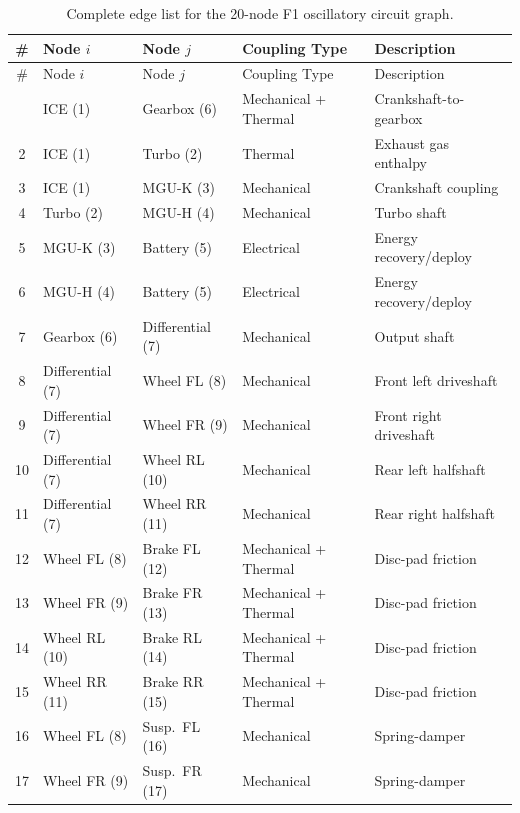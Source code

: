 \documentclass[twocolumn,10pt,a4paper]{article}
\theoremstyle{definition}
\theoremstyle{remark}
\begin{document}
\begin{longtable}{@{}cllll@{}}
\caption{Complete edge list for the 20-node F1 oscillatory circuit graph.} \label{tab:edges} \\
\toprule
\# & Node $i$ & Node $j$ & Coupling Type & Description \\
\midrule
\endfirsthead
\toprule
\# & Node $i$ & Node $j$ & Coupling Type & Description \\
\midrule
\endhead
\bottomrule
\endlastfoot
1  & ICE (1)          & Gearbox (6)      & Mechanical + Thermal & Crankshaft-to-gearbox \\
2  & ICE (1)          & Turbo (2)        & Thermal              & Exhaust gas enthalpy \\
3  & ICE (1)          & MGU-K (3)        & Mechanical           & Crankshaft coupling \\
4  & Turbo (2)        & MGU-H (4)        & Mechanical           & Turbo shaft \\
5  & MGU-K (3)        & Battery (5)      & Electrical           & Energy recovery/deploy \\
6  & MGU-H (4)        & Battery (5)      & Electrical           & Energy recovery/deploy \\
7  & Gearbox (6)      & Differential (7) & Mechanical           & Output shaft \\
8  & Differential (7) & Wheel FL (8)     & Mechanical           & Front left driveshaft \\
9  & Differential (7) & Wheel FR (9)     & Mechanical           & Front right driveshaft \\
10 & Differential (7) & Wheel RL (10)    & Mechanical           & Rear left halfshaft \\
11 & Differential (7) & Wheel RR (11)    & Mechanical           & Rear right halfshaft \\
12 & Wheel FL (8)     & Brake FL (12)    & Mechanical + Thermal & Disc-pad friction \\
13 & Wheel FR (9)     & Brake FR (13)    & Mechanical + Thermal & Disc-pad friction \\
14 & Wheel RL (10)    & Brake RL (14)    & Mechanical + Thermal & Disc-pad friction \\
15 & Wheel RR (11)    & Brake RR (15)    & Mechanical + Thermal & Disc-pad friction \\
16 & Wheel FL (8)     & Susp.\ FL (16)   & Mechanical           & Spring-damper \\
17 & Wheel FR (9)     & Susp.\ FR (17)   & Mechanical           & Spring-damper \\

\end{longtable}
\end{document}
